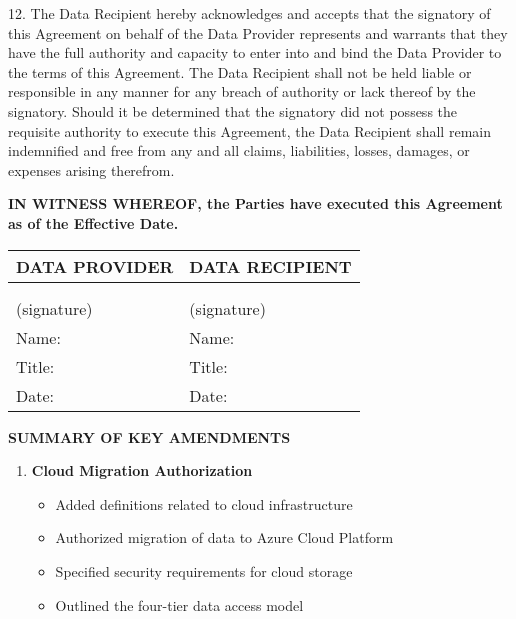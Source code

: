 {\begin{enumerate}

12. The Data Recipient hereby acknowledges and accepts that the signatory of this Agreement on behalf of the Data Provider represents and warrants that they have the full authority and capacity to enter into and bind the Data Provider to the terms of this Agreement. The Data Recipient shall not be held liable or responsible in any manner for any breach of authority or lack thereof by the signatory. Should it be determined that the signatory did not possess the requisite authority to execute this Agreement, the Data Recipient shall remain indemnified and free from any and all claims, liabilities, losses, damages, or expenses arising therefrom.

\vspace{0.5cm}

\textbf{IN WITNESS WHEREOF, the Parties have executed this Agreement as of the  Effective Date.}

\vspace{1cm}

\begin{tabular}{|p{}|p{}|}
\hline
\textbf{DATA PROVIDER} & \textbf{DATA RECIPIENT} \\
\hline
 & \\
 & \\
\hline
(signature) & (signature) \\
\hline
Name: & Name: \\
\hline
Title: & Title: \\
\hline
Date: & Date: \\
\hline
\end{tabular}

\vspace{2cm}

\begin{center}
\textbf{\Large SUMMARY OF KEY AMENDMENTS}
\end{center}

\begin{enumerate}
\item \textbf{Cloud Migration Authorization}
   \begin{itemize}
   \item Added definitions related to cloud infrastructure
   \item Authorized migration of data to Azure Cloud Platform
   \item Specified security requirements for cloud storage
   \item Outlined the four-tier data access model
   \end{itemize}


\end{enumerate}
\end{enumerate}}
